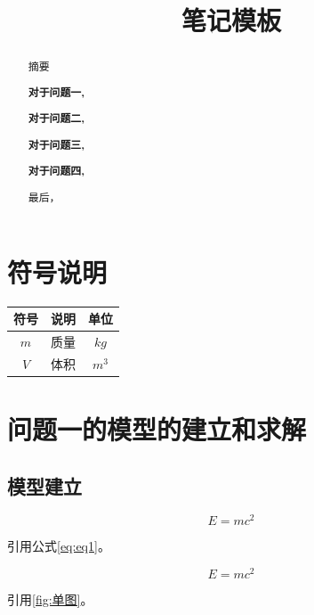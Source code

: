 \documentclass[withoutpreface,bwprint]{NoteBook}
\title{笔记模板}  %
\begin{document}
\maketitle
\begin{abstract}
摘要

\textbf{对于问题一,}

\textbf{对于问题二,}

\textbf{对于问题三,}

\textbf{对于问题四,}

最后，

\end{abstract}


\section{符号说明}
\begin{table}[H]
\centering
\begin{tabularx}{\textwidth}{CLC} %
\toprule
符号    & 说明    & 单位 \\
\midrule
$m     $& 质量 & $kg$ \\
$V     $& 体积 & $m^3$ \\
\bottomrule
\end{tabularx}
\label{tab:符号说明}
\end{table}



\section{问题一的模型的建立和求解}
\subsection{模型建立}

$$
E = mc^2  %
$$

引用公式\cref{eq:eq1}。

\begin{equation}
\label{eq:eq1}  %
E = mc^2
\end{equation}

引用\cref{fig:单图}。
\end{document}
